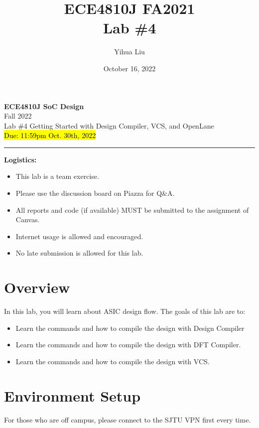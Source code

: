 \documentclass[a4paper,12pt,twoside]{article}
\author{Yihua Liu}
\title{ECE4810J FA2021\\ \small Lab \#4}
\date{October 16, 2022}
\begin{document}
\thispagestyle{fancy}

\begin{center}
    \vspace*{0pt}
    \Large{\textbf{ECE4810J SoC Design}}\\
    \vspace*{2pt}
    \large{Fall 2022}\\
    \vspace*{10pt}
    \Large{\textcolor{caption2color}{Lab \#4 Getting Started with Design Compiler, VCS, and OpenLane}}\\
    \normalsize{\hl{Due: 11:59pm Oct. 30th, 2022}}
    \rule[-5pt]{.97\linewidth}{0.05em}
\end{center}

\textbf{Logistics:}
\begin{itemize}
    \item This lab is a team exercise.
    \item Please use the discussion board on Piazza for Q\&A.
    \item All reports and code (if available) MUST be submitted to the assignment of Canvas.
    \item Internet usage is allowed and encouraged.
    \item No late submission is allowed for this lab.
\end{itemize}

\tableofcontents

\newpage
\section{Overview}
In this lab, you will learn about ASIC design flow. The goals of this lab are to:
\begin{itemize}
    \item Learn the commands and how to compile the design with Design Compiler
    \item Learn the commands and how to compile the design with DFT Compiler.
    \item Learn the commands and how to compile the design with VCS.
\end{itemize}

\section{Environment Setup}
For those who are off campus, please connect to the SJTU VPN first every time.
\end{document}
